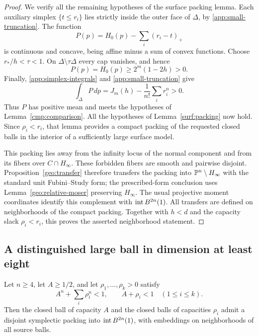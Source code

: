 \begin{proof}
We verify all the remaining hypotheses of the surface packing lemma.
Each auxiliary simplex $\{t\le r_i\}$ lies strictly inside the outer face
of $\Delta$, by \eqref{app:small-truncation}. The function
\[
 P(p)=H_0(p)-\sum_i(r_i-t)_+
\]
is continuous and concave, being affine minus a sum of convex functions.
Choose $r_*/h<\tau<1$. On $\Delta\setminus\tau\Delta$ every cap vanishes,
and hence
\[
 P(p)=H_0(p)\ge2^m(1-2h)>0.
\]
Finally, \eqref{app:simplex-integrals} and
\eqref{app:small-truncation} give
\[
 \int_\Delta P\,dp=J_m(h)-\frac1{n!}\sum_i r_i^n>0.
\]
Thus $P$ has positive mean and meets the hypotheses of
Lemma~\ref{cmp:comparison}. All the hypotheses of
Lemma~\ref{surf:packing} now hold. Since $\rho_i<r_i$, that lemma provides
a compact packing of the requested closed balls in the interior of a
sufficiently large surface model.

This packing lies away from the infinity locus of the normal component
and from its fibers over $C\cap H_\infty$. These forbidden fibers are
smooth and pairwise disjoint. Proposition~\ref{geo:transfer} therefore
transfers the packing into $\mathbb P^n\setminus H_\infty$ with the standard
unit Fubini--Study form; the prescribed-form conclusion uses
Lemma~\ref{geo:relative-moser} preserving $H_\infty$. The usual projective
moment coordinates identify this complement with $\operatorname{int} B^{2n}(1)$.
All transfers are defined on neighborhoods of the compact packing.
Together with $h<d$ and the capacity slack $\rho_i<r_i$, this proves the
asserted neighborhood statement.
\end{proof}

\subsection{A distinguished large ball in dimension at least eight}

\begin{proposition}\label{app:large}
Let $n\ge4$, let $A\ge1/2$, and let $\rho_1,\ldots,\rho_k>0$ satisfy
\[
 A^n+\sum_i\rho_i^n<1,\qquad A+\rho_i<1\quad(1\le i\le k).
\]
Then the closed ball of capacity $A$ and the closed balls of capacities
$\rho_i$ admit a disjoint symplectic packing into $\operatorname{int} B^{2n}(1)$, with
embeddings on neighborhoods of all source balls.
\end{proposition}

